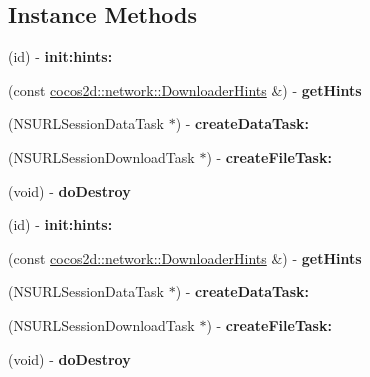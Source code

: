 \subsection*{Instance Methods}
\begin{DoxyCompactItemize}
\item 
\mbox{\label{interfaceDownloaderAppleImpl_a3407066493d8d02eea22d91e1fb7486f}} 
(id) -\/ {\bfseries init\+:hints\+:}
\item 
\mbox{\label{interfaceDownloaderAppleImpl_a3fce08b2aba330f2a7576720f196678b}} 
(const \hyperlink{classcocos2d_1_1network_1_1DownloaderHints}{cocos2d\+::network\+::\+Downloader\+Hints} \&) -\/ {\bfseries get\+Hints}
\item 
\mbox{\label{interfaceDownloaderAppleImpl_aa7115f65d376da46a00b5d79f7d26cf4}} 
(N\+S\+U\+R\+L\+Session\+Data\+Task $\ast$) -\/ {\bfseries create\+Data\+Task\+:}
\item 
\mbox{\label{interfaceDownloaderAppleImpl_a4f699865d0a8016b1a54e23397fab4e8}} 
(N\+S\+U\+R\+L\+Session\+Download\+Task $\ast$) -\/ {\bfseries create\+File\+Task\+:}
\item 
\mbox{\label{interfaceDownloaderAppleImpl_a90d85222bc6241a30167b17364c12e76}} 
(void) -\/ {\bfseries do\+Destroy}
\item 
\mbox{\label{interfaceDownloaderAppleImpl_a3407066493d8d02eea22d91e1fb7486f}} 
(id) -\/ {\bfseries init\+:hints\+:}
\item 
\mbox{\label{interfaceDownloaderAppleImpl_a2c4b0d1171c32799cc15dd0ec54bd3e2}} 
(const \hyperlink{classcocos2d_1_1network_1_1DownloaderHints}{cocos2d\+::network\+::\+Downloader\+Hints} \&) -\/ {\bfseries get\+Hints}
\item 
\mbox{\label{interfaceDownloaderAppleImpl_aa7115f65d376da46a00b5d79f7d26cf4}} 
(N\+S\+U\+R\+L\+Session\+Data\+Task $\ast$) -\/ {\bfseries create\+Data\+Task\+:}
\item 
\mbox{\label{interfaceDownloaderAppleImpl_a4f699865d0a8016b1a54e23397fab4e8}} 
(N\+S\+U\+R\+L\+Session\+Download\+Task $\ast$) -\/ {\bfseries create\+File\+Task\+:}
\item 
\mbox{\label{interfaceDownloaderAppleImpl_a90d85222bc6241a30167b17364c12e76}} 
(void) -\/ {\bfseries do\+Destroy}
\end{DoxyCompactItemize}
